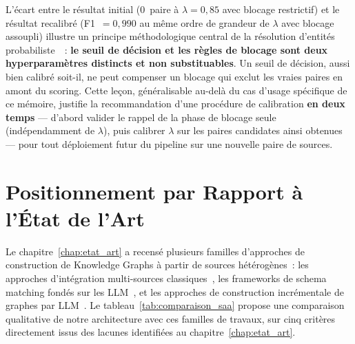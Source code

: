 L'écart entre le résultat initial (0~paire à $\lambda = 0{,}85$ avec
blocage restrictif) et le résultat recalibré (F1~$= 0{,}990$ au même
ordre de grandeur de $\lambda$ avec blocage assoupli) illustre un
principe méthodologique central de la résolution d'entités
probabiliste~\cite{fellegi1969theory,linacre2023splink}~: \textbf{le
seuil de décision et les règles de blocage sont deux hyperparamètres
distincts et non substituables}. Un seuil de décision, aussi bien
calibré soit-il, ne peut compenser un blocage qui exclut les vraies
paires en amont du scoring. Cette leçon, généralisable au-delà du cas
d'usage spécifique de ce mémoire, justifie la recommandation d'une
procédure de calibration \textbf{en deux temps} --- d'abord valider le
rappel de la phase de blocage seule (indépendamment de $\lambda$), puis
calibrer $\lambda$ sur les paires candidates ainsi obtenues --- pour
tout déploiement futur du pipeline sur une nouvelle paire de sources.

\section{Positionnement par Rapport à l'État de l'Art}
\label{sec:comparaison_saa}

Le chapitre~\ref{chap:etat_art} a recensé plusieurs familles d'approches
de construction de Knowledge Graphs à partir de sources hétérogènes~:
les approches d'intégration multi-sources classiques~\cite{yan2023enterprise,
branco2025integration}, les frameworks de schema matching fondés sur les
LLM~\cite{llmatch2025,schemora2025}, et les approches de construction
incrémentale de graphes par LLM~\cite{itext2kg2024}. Le
tableau~\ref{tab:comparaison_saa} propose une comparaison qualitative de
notre architecture avec ces familles de travaux, sur cinq critères
directement issus des lacunes identifiées au
chapitre~\ref{chap:etat_art}.

